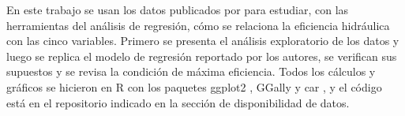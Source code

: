 En este trabajo se usan los datos publicados por \citet{Lakdawala2025} para estudiar, con las herramientas del análisis de regresión, cómo se relaciona la eficiencia hidráulica con las cinco variables. Primero se presenta el análisis exploratorio de los datos y luego se replica el modelo de regresión reportado por los autores, se verifican sus supuestos y se revisa la condición de máxima eficiencia. Todos los cálculos y gráficos se hicieron en R \citep{RCoreTeam} con los paquetes \textsf{ggplot2} \citep{Wickham2016}, \textsf{GGally} \citep{GGally} y \textsf{car} \citep{Fox2019}, y el código está en el repositorio indicado en la sección de disponibilidad de datos.
